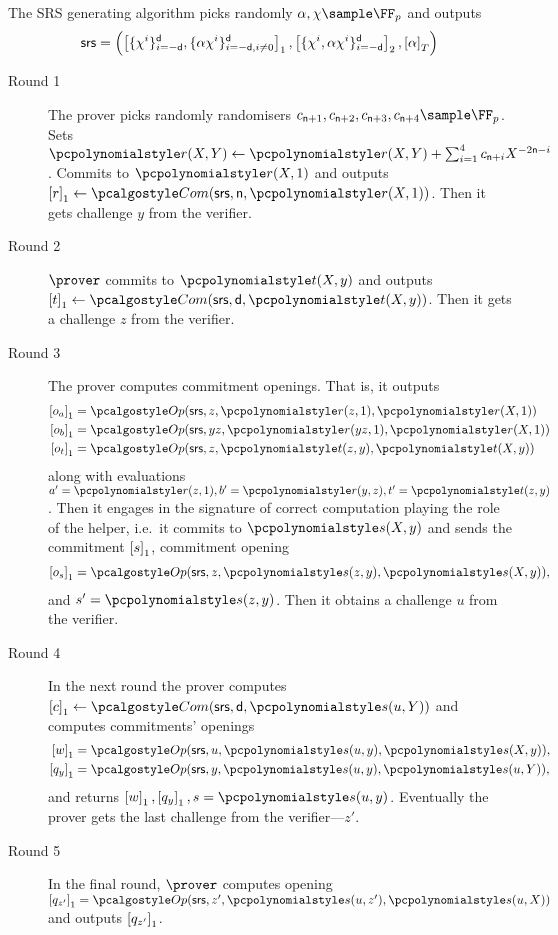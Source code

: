  The SRS generating algorithm picks
randomly $\alpha, \chi \sample \FF_p$ and outputs
	\[
      \mathsf{srs} = \left( \left[\{\chi^i\}_{i = -\mathsf{d}}^{\mathsf{d}},
          \{\alpha \chi^i\}_{i = -\mathsf{d}, i \neq 0}^{\mathsf{d}}\right]_{1},
        \left[\{\chi^i, \alpha \chi^i\}_{i = - \mathsf{d}}^{\mathsf{d}}\right]_{2},
        \left[\alpha\right]_{T} \right)
	\]
\begin{description}
\item[Round 1] The prover picks randomly randomisers
  $c_{\multconstr + 1}, c_{\multconstr + 2}, c_{\multconstr + 3}, c_{\multconstr
    + 4} \sample \FF_p$. Sets
  $\pr(X, Y) \gets \pr(X, Y) + \sum_{i = 1}^4 c_{\multconstr + i} X^{- 2
    \multconstr - i}$. Commits to $\pr(X, 1)$ and outputs
  $\gone{r} \gets \com(\srs, \multconstr, \pr(X, 1))$.  Then it gets challenge $y$ from
  the verifier.
\item[Round 2] $\prover$ commits to $\pt(X, y)$ and outputs
  $\gone{t} \gets \com(\srs, \dconst, \pt(X, y))$. Then it gets a challenge $z$ from
  the verifier.
\item[Round 3] The prover computes commitment openings. That is, it outputs
  \begin{align*}
    \gone{o_a} & = \open(\srs, z, \pr(z, 1), \pr(X, 1)) \\
    \gone{o_b} & = \open(\srs, yz, \pr(yz, 1), \pr(X, 1)) \\
    \gone{o_t} & = \open(\srs, z, \pt(z, y), \pt(X, y)) 
  \end{align*}
  along with evaluations $a' = \pr(z, 1), b' = \pr(y, z), t' = \pt(z, y)$.  Then it
  engages in the signature of correct computation playing the role of the
  helper, i.e.~it commits to $\p{s}(X, y)$ and sends the commitment $\left[s\right]_{1}$, commitment opening
  \begin{align*}
    \gone{o_s} & = \open(\srs, z, \p{s}(z, y), \p{s}(X, y)), \\
  \end{align*} and $s'=\p{s}(z, y)$. 
%
  Then
  it obtains a challenge $u$ from the verifier.
\item[Round 4] In the next round the prover computes
  $\gone{c} \gets \com(\srs, \dconst, \p{s}(u, Y))$ and
  computes commitments' openings
  \begin{align*}
    \gone{w} & = \open(\srs, u, \p{s}(u, y), \p{s}(X, y)), \\
    \gone{q_y} & = \open(\srs, y,\p{s}(u, y), \p{s}(u, Y)),
  \end{align*}
  and returns $\gone{w}, \gone{q_y}, s = \p{s}(u, y)$. Eventually the prover gets the last challenge
  from the verifier---$z'$.
\item[Round 5] In the final round, $\prover$ computes opening
  $\gone{q_{z'}} = \open(\srs, z', \p{s}(u, z'), \p{s}(u, X))$ and outputs $\left[q_{z'}\right]_{1}$.
\end{description}

